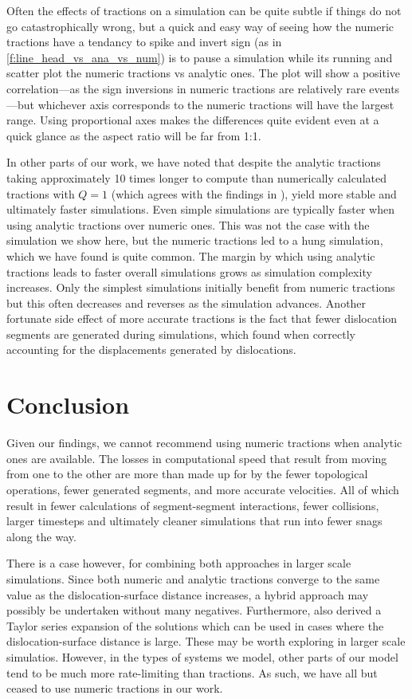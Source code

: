 \documentclass[11pt]{iopart}
\begin{document}
Often the effects of tractions on a simulation can be quite subtle if things do not go catastrophically wrong, but a quick and easy way of seeing how the numeric tractions have a tendancy to spike and invert sign (as in \cref{f:line_head_vs_ana_vs_num}) is to pause a simulation while its running and scatter plot the numeric tractions vs analytic ones. The plot will show a positive correlation---as the sign inversions in numeric tractions are relatively rare events---but whichever axis corresponds to the numeric tractions will have the largest range. Using proportional axes makes the differences quite evident even at a quick glance as the aspect ratio will be far from 1:1.

In other parts of our work, we have noted that despite the analytic tractions taking approximately 10 times longer to compute than numerically calculated tractions with $Q = 1$ (which agrees with the findings in \cite{Queyreau}), yield more stable and ultimately faster simulations. Even simple simulations are typically faster when using analytic tractions over numeric ones. This was not the case with the simulation we show here, but the numeric tractions led to a hung simulation, which we have found is quite common. The margin by which using analytic tractions leads to faster overall simulations grows as simulation complexity increases. Only the simplest simulations initially benefit from numeric tractions but this often decreases and reverses as the simulation advances. Another fortunate side effect of more accurate tractions is the fact that fewer dislocation segments are generated during simulations, which \citet{bromage2018calculating} found when correctly accounting for the displacements generated by dislocations.

\section{Conclusion}

Given our findings, we cannot recommend using numeric tractions when analytic ones are available. The losses in computational speed that result from moving from one to the other are more than made up for by the fewer topological operations, fewer generated segments, and more accurate velocities. All of which result in fewer calculations of segment-segment interactions, fewer collisions, larger timesteps and ultimately cleaner simulations that run into fewer snags along the way.

There is a case however, for combining both approaches in larger scale simulations. Since both numeric and analytic tractions converge to the same value as the dislocation-surface distance increases, a hybrid approach may possibly be undertaken without many negatives. Furthermore, \cite{Queyreau} also derived a Taylor series expansion of the solutions which can be used in cases where the dislocation-surface distance is large. These may be worth exploring in larger scale simulatios. However, in the types of systems we model, other parts of our model tend to be much more rate-limiting than tractions. As such, we have all but ceased to use numeric tractions in our work.
\end{document}
